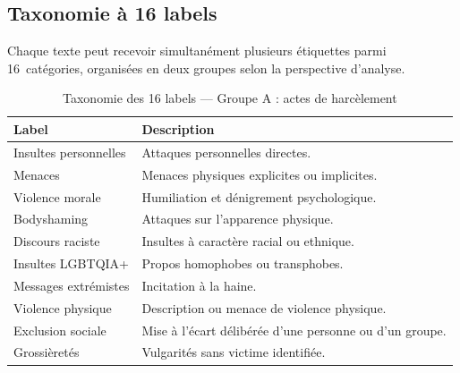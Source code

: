 \subsection{Taxonomie à 16 labels}
\label{subsec:taxonomie_classif}

Chaque texte peut recevoir simultanément plusieurs étiquettes parmi 16~catégories,
organisées en deux groupes selon la perspective d'analyse.

\vspace{6pt}
\begin{table}[H]
\centering
\caption{Taxonomie des 16 labels — Groupe A : actes de harcèlement}
\label{tab:taxonomie_groupeA}
\small
\begin{tabular}{|l|p{9cm}|}
\hline
\textbf{Label} & \textbf{Description} \\
\hline
Insultes personnelles   & Attaques personnelles directes. \\
\hline
Menaces                 & Menaces physiques explicites ou implicites. \\
\hline
Violence morale         & Humiliation et dénigrement psychologique. \\
\hline
Bodyshaming             & Attaques sur l'apparence physique. \\
\hline
Discours raciste        & Insultes à caractère racial ou ethnique. \\
\hline
Insultes LGBTQIA+       & Propos homophobes ou transphobes. \\
\hline
Messages extrémistes    & Incitation à la haine. \\
\hline
Violence physique       & Description ou menace de violence physique. \\
\hline
Exclusion sociale       & Mise à l'écart délibérée d'une personne ou d'un groupe. \\
\hline
Grossièretés            & Vulgarités sans victime identifiée. \\
\hline
\end{tabular}
\end{table}

